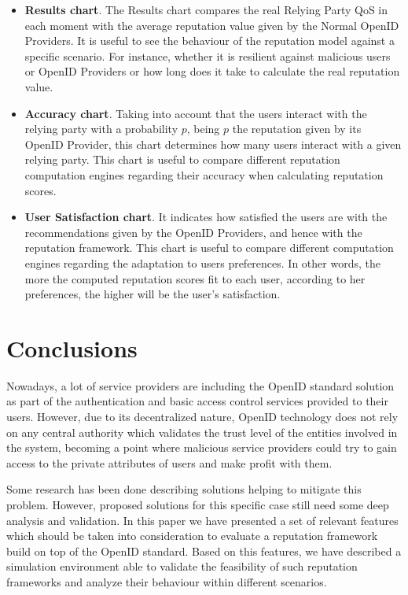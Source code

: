 \documentclass{llncs}
\begin{document}
\begin{itemize}

\item \textbf{Results chart}. The Results chart compares the real Relying Party QoS in each moment with the average reputation value given by the Normal OpenID Providers. It is useful to see the behaviour of the reputation model against a specific scenario. For instance, whether it is resilient against malicious users or OpenID Providers or how long does it take to calculate the real reputation value.

\item \textbf{Accuracy chart}. Taking into account that the users interact with the relying party with a probability $p$, being $p$ the reputation given by its OpenID Provider, this chart determines how many users interact with a given relying party. This chart
is useful to compare different reputation computation engines regarding their accuracy when calculating reputation scores.



\item \textbf{User Satisfaction chart}. It indicates how satisfied the users are with the recommendations given by the OpenID Providers, and hence with the reputation framework.
This chart
is useful to compare different computation engines regarding the adaptation to users preferences. In other words, the more the computed reputation scores fit to each user, according to her preferences, the higher will be the user's satisfaction.



\end{itemize}

\section{Conclusions}\label{sec:conclusions}

Nowadays, a lot of service providers are including the OpenID standard solution as part of the authentication and basic access control services provided to their users. However, due to its decentralized nature, OpenID technology does not rely on any central authority which validates the trust level of the entities involved in the system, becoming a point where malicious service providers could try to gain access to the private attributes of users and make profit with them.

Some research has been done describing solutions helping to mitigate this problem. However, proposed solutions for this specific case still need some deep analysis and validation. In this paper we have presented a set of relevant features which should be taken into consideration to evaluate a reputation framework build on top of the OpenID standard. Based on this features, we have described a simulation environment able to validate the feasibility of such reputation frameworks and analyze their behaviour within different scenarios.



\end{document}
